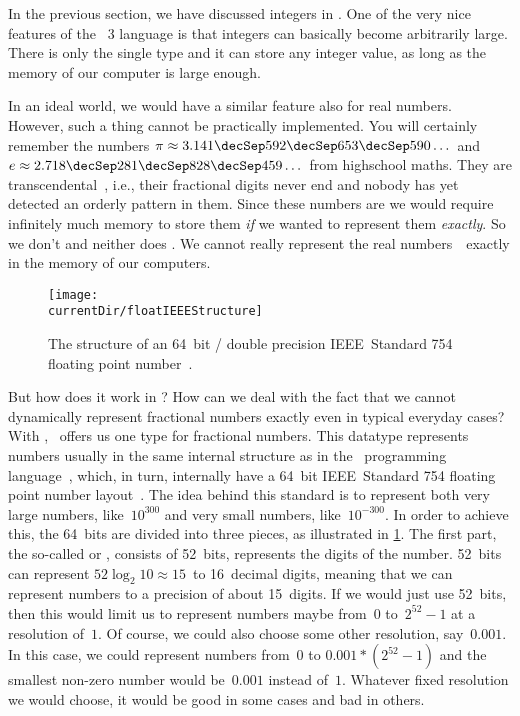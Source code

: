 %
\label{sec:float}%
%
In the previous section, we have discussed integers in \python.
One of the very nice features of the \python~3 language is that integers can basically become arbitrarily large.
There is only the single type  and it can store any integer value, as long as the memory of our computer is large enough.%
%
\begin{sloppypar}%
In an ideal world, we would have a similar feature also for real numbers.
However, such a thing cannot be practically implemented.
You will certainly remember the numbers $\pi\approx3.141\decSep592\decSep653\decSep590\dots$ and $e\approx2.718\decSep281\decSep828\decSep459\dots$ from highschool maths.
They are transcendental~\cite{N1939TTOP,APM1991TOEAP,F2011TTOEAP}, i.e., their fractional digits never end and nobody has yet detected an orderly pattern in them.
Since these numbers are  we would require infinitely much memory to store them \emph{if} we wanted to represent them \emph{exactly}.
So we don't and neither does \python.
We cannot really represent the real numbers~\realNumbers\ exactly in the memory of our computers.%
\end{sloppypar}%
%
%
\label{sec:howFloatingPointNumbersWork}%
%
\begin{figure}%
\centering%
\texttt{[image: \\currentDir/floatIEEEStructure]}%
\caption{The structure of an 64~bit / double precision IEEE~Standard 754 floating point number~\cite{IEEE2019ISFFPA,H1997IS7FPN}.}%
\label{fig:floatIEEEStructure}%
\end{figure}%
%
But how does it work in \python?
How can we deal with the fact that we cannot dynamically represent fractional numbers exactly even in typical everyday cases?
With , \python\ offers us one type for fractional numbers.
This datatype represents numbers usually in the same internal structure as  in the ~programming language~\cite{PSF2024NTIFC}, which, in turn, internally have a 64~bit IEEE~Standard 754 floating point number layout~\cite{IEEE2019ISFFPA,H1997IS7FPN}.
The idea behind this standard is to represent both very large numbers, like~$10^{300}$ and very small numbers, like~$10^{-300}$.
In order to achieve this, the 64~bits are divided into three pieces, as illustrated in \cref{fig:floatIEEEStructure}.
%
%
%
The first part, the so-called  or , consists of 52~bits, represents the digits of the number.
52~bits can represent $52\log_2 10\approx 15$~to 16~decimal digits, meaning that we can represent numbers to a precision of about 15~digits.
If we would just use 52~bits, then this would limit us to represent numbers maybe from~$0$ to~$2^{52}-1$ at a resolution of~$1$.
Of course, we could also choose some other resolution, say~$0.001$.
In this case, we could represent numbers from~$0$ to $0.001*(2^{52}-1)$ and the smallest non-zero number would be~$0.001$ instead of~$1$.
Whatever fixed resolution we would choose, it would be good in some cases and bad in others.

